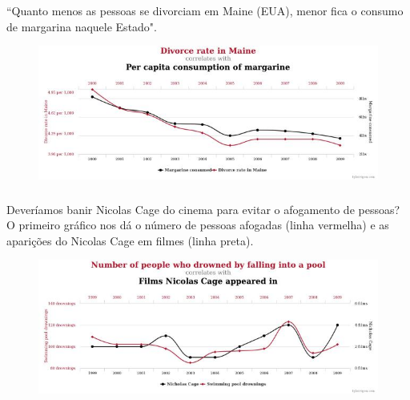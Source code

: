 \documentclass[14pt,aspectratio=1610]{beamer}
\begin{document}
\begin{frame}{}
\frametitle{ }
\begin{block}{}
\justifying
``Quanto menos as pessoas se divorciam em Maine (EUA), menor fica o consumo de margarina naquele Estado". 
\end{block}
\begin{figure}[H]
    \centering
    \includegraphics[scale=0.5]{Figuras/Margarina}
\end{figure}
\end{frame}

\begin{frame}{}
\frametitle{ }
\begin{block}{}
\justifying
Deveríamos banir Nicolas Cage do cinema para evitar o afogamento de pessoas? O primeiro gráfico nos dá o número de pessoas afogadas (linha vermelha) e as aparições do Nicolas Cage em filmes (linha preta).
\end{block} 
\begin{figure}[H]
    \centering
    \includegraphics[scale=0.5]{Figuras/Nicolas}
\end{figure}
\end{frame}
\end{document}
